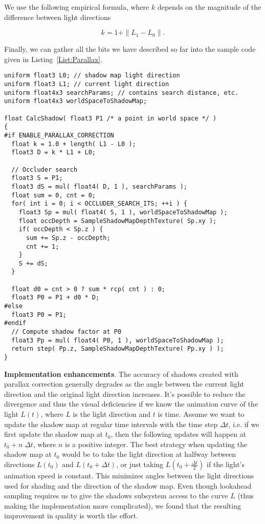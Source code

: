 We use the following empirical formula, where $k$ depends on 
the magnitude of the difference between light directions

\begin{equation}\label{Eq:6}
k = 1 + \| L_1 - L_0 \|.
\end{equation}

Finally, we can gather all the bits we have described so far into the sample
code given in Listing~\ref{List:Parallax}.

\lstset{language=C}
\begin{lstlisting}[float,caption={Example implementation of the parallax correction 
for a simple orthogonal shadow map.},label=List:Parallax]
uniform float3 L0; // shadow map light direction
uniform float3 L1; // current light direction
uniform float4x3 searchParams; // contains search distance, etc.
uniform float4x3 worldSpaceToShadowMap;

float CalcShadow( float3 P1 /* a point in world space */ )
{
#if ENABLE_PARALLAX_CORRECTION
  float k = 1.0 + length( L1 - L0 );
  float3 D = k * L1 + L0;

  // Occluder search    
  float3 S = P1;
  float3 dS = mul( float4( D, 1 ), searchParams );
  float sum = 0, cnt = 0;
  for( int i = 0; i < OCCLUDER_SEARCH_ITS; ++i ) {
    float3 Sp = mul( float4( S, 1 ), worldSpaceToShadowMap );
    float occDepth = SampleShadowMapDepthTexture( Sp.xy );
    if( occDepth < Sp.z ) {
      sum += Sp.z - occDepth;
      cnt += 1;
    }
    S += dS;
  }

  float d0 = cnt > 0 ? sum * rcp( cnt ) : 0;
  float3 P0 = P1 + d0 * D;
#else
  float3 P0 = P1;
#endif    
  // Compute shadow factor at P0
  float3 Pp = mul( float4( P0, 1 ), worldSpaceToShadowMap );
  return step( Pp.z, SampleShadowMapDepthTexture( Pp.xy ) );
}
\end{lstlisting}

\bigskip
\textbf{Implementation enhancements}. The accuracy of shadows created with parallax correction generally 
degrades as the angle between the current light direction and the original light direction increases.
It's possible to reduce the divergence 
and thus the visual deficiencies if we know the animation curve of the light $L(t)$,
where $L$ is the light direction and $t$ is time. Assume we want to update the shadow
map at regular time intervals with the time step $\Delta t$, i.e. if we first update
the shadow map at $t_0$, then the following updates will happen at $t_0 + n\;\Delta t$,
where $n$ is a positive integer. The best strategy when updating the shadow map at $t_0$
would be to take the light direction at halfway between directions $L(t_0)$ and 
$L(t_0 + \Delta t)$, or just taking $L(t_0 + \frac{\Delta t}{2})$
if the light's animation speed is constant. This minimizes angles between the light directions
used for shading and the direction of the shadow map. Even though  
lookahead sampling requires 
us to give the shadows subsystem access to the curve $L$ (thus making the implementation more complicated),
we found that the resulting improvement in quality is worth the effort. 

